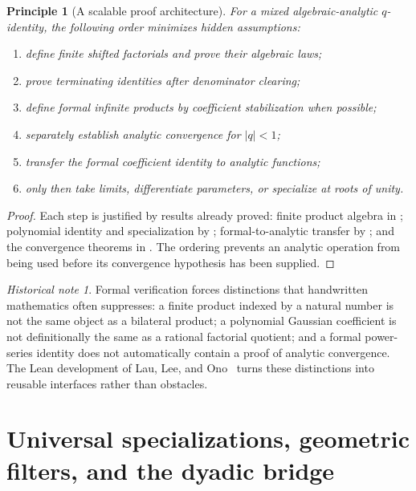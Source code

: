 \documentclass[11pt,oneside,openany]{book}
\newtheorem{principle}[theorem]{Principle}
\theoremstyle{definition}
\theoremstyle{remark}
\newtheorem{historicalnote}[theorem]{Historical note}
\newcommand{\abs}[1]{\lvert #1\rvert}
\begin{document}
\begin{principle}[A scalable proof architecture]\label{prin:proof-architecture}
For a mixed algebraic-analytic $q$-identity, the following order minimizes hidden assumptions:
\begin{enumerate}
\item define finite shifted factorials and prove their algebraic laws;
\item prove terminating identities after denominator clearing;
\item define formal infinite products by coefficient stabilization when possible;
\item separately establish analytic convergence for $\abs q<1$;
\item transfer the formal coefficient identity to analytic functions;
\item only then take limits, differentiate parameters, or specialize at roots of unity.
\end{enumerate}
\end{principle}

\begin{proof}
Each step is justified by results already proved: finite product algebra in ; polynomial identity and specialization by ; formal-to-analytic transfer by ; and the convergence theorems in .  The ordering prevents an analytic operation from being used before its convergence hypothesis has been supplied.
\end{proof}

\begin{historicalnote}
Formal verification forces distinctions that handwritten mathematics often suppresses: a finite product indexed by a natural number is not the same object as a bilateral product; a polynomial Gaussian coefficient is not definitionally the same as a rational factorial quotient; and a formal power-series identity does not automatically contain a proof of analytic convergence.  The Lean development of Lau, Lee, and Ono~\cite{LauLeeOno2026} turns these distinctions into reusable interfaces rather than obstacles.
\end{historicalnote}


\part{Universal specializations, geometric filters, and the dyadic bridge}
\end{document}

